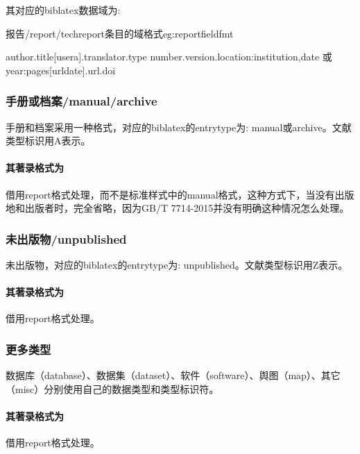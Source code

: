 其对应的biblatex数据域为:
\begin{example}{报告/report/techreport条目的域格式}{eg:reportfieldfmt}
\begin{texlist}
author.title[usera].translator.type number.version.location:institution,date 或year:pages[urldate].url.doi
\end{texlist}
\end{example}


\subsubsection{手册或档案/manual/archive}
\begin{refentry}{}{}
手册和档案采用一种格式，对应的biblatex的entrytype为: manual或archive。文献类型标识用A表示。

\paragraph{其著录格式为} 借用report格式处理，而不是标准样式中的manual格式，这种方式下，当没有出版地和出版者时，完全省略，因为GB/T 7714-2015并没有明确这种情况怎么处理。
\end{refentry}


\subsubsection{未出版物/unpublished}
\begin{refentry}{}{}
未出版物，对应的biblatex的entrytype为: unpublished。文献类型标识用Z表示。

\paragraph{其著录格式为} 借用report格式处理。
\end{refentry}

\subsubsection{更多类型}
\begin{refentry}{}{}
数据库（database）、数据集（dataset）、软件（software）、舆图（map）、其它（misc）分别使用自己的数据类型和类型标识符。

\paragraph{其著录格式为} 借用report格式处理。
\end{refentry}



